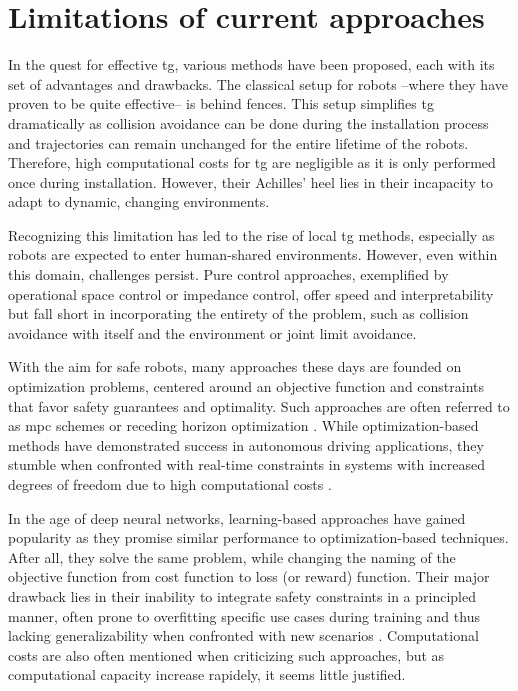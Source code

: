 \section{Limitations of current approaches}

In the quest for effective \ac{tg}, various
methods have been proposed, each with its set of advantages and
drawbacks.
The classical setup for robots --where they have
proven to be quite effective-- is behind fences. This setup
simplifies \ac{tg} dramatically as collision
avoidance can be done during the installation process and
trajectories can remain unchanged for the entire lifetime of
the robots. Therefore, high computational costs for
\ac{tg} are negligible as it is only performed
once during installation. However, their Achilles' heel lies
in their incapacity to adapt to dynamic, changing
environments.

Recognizing this limitation has led to the rise of local
\ac{tg} methods, especially as robots are
expected to enter human-shared environments. However, even
within this domain, challenges persist. Pure control
approaches, exemplified by operational space control or
impedance control, offer speed and interpretability but fall
short in incorporating the entirety of the problem, such as
collision avoidance with itself and the environment or
joint limit avoidance.

With the aim for safe robots, many approaches these days are
founded on optimization problems, centered around an
objective function and constraints that favor safety
guarantees and optimality. Such approaches are often
referred to as \ac{mpc} schemes or receding
horizon optimization \cite{hewing2020learning}. While
optimization-based methods have demonstrated success in
autonomous driving applications, they stumble when
confronted with real-time constraints in systems with
increased degrees of freedom due to high computational costs
\cite{spahn2021coupled}.

In the age of deep neural networks, learning-based
approaches have gained popularity as they promise similar
performance to optimization-based techniques. After all,
they solve the same problem, while changing the naming of
the objective function from cost function to loss (or
reward) function. Their major drawback lies in their
inability to integrate safety constraints in a principled
manner, often prone to overfitting specific use cases during
training and thus lacking generalizability when confronted
with new scenarios \cite{noroozi2023conventional}.
Computational costs are also often
mentioned when criticizing such approaches, but as
computational capacity increase rapidely, it seems little
justified. 

